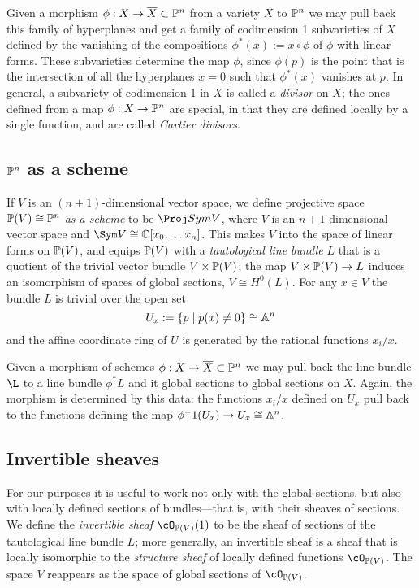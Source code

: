 Given a morphism $\phi: X\to \overline X \subset \PP^n$ from a variety $X$ to $\PP^n$ we may pull back this family of hyperplanes and get a family of codimension 1 subvarieties of $X$ defined by the vanishing of the compositions $\phi^*(x) := x\circ \phi$ of $\phi$ with linear forms. These subvarieties determine the map $\phi$, since $\phi(p)$ is the point that is the intersection of all the hyperplanes $x=0$ such that
$\phi^*(x)$ vanishes at $p$. In general, a subvariety of codimension 1 in $X$ is called a \emph{divisor} on $X$; the ones defined from a map $\phi: X\to \PP^n$ are special, in that they are defined locally by a single function, and are called \emph{Cartier divisors}.

\subsection{$\PP^n$ as a scheme}If $V$ is an $(n+1)$-dimensional vector space, we define projective space 
$\PP(V) \cong \PP^n$ \emph{as a scheme} to be $\Proj Sym V$, where $V$ is an $n+1$-dimensional vector space
and $\Sym V \cong \CC[x_0,\dots x_n]$. This makes $V$ into the space of linear forms on $\PP(V)$, and equips $\PP(V)$ with a \emph{tautological line bundle} $L$ that is a quotient of the trivial vector bundle
$V\times \PP(V)$; the map $V\times \PP(V) \to L$ induces an isomorphism of spaces of global sections,
$V \cong H^0(L)$. For any $x\in V$ the bundle $L$ is trivial over the open set 
$$
U_x :=  \{p \mid p(x) \neq 0\} \cong \AA^n
$$
and the affine coordinate ring of $U$ is generated by the rational functions $x_i/x$.

Given a morphism of schemes $\phi: X\to \overline X \subset \PP^n$ we may pull back the line bundle $\L$  to a line bundle $\phi^*L$ and it global sections to global sections on $X$. Again, the morphism is determined by this data: the functions $x_i/x$ defined on $U_x$ pull back to the functions defining the map
$\phi^-1(U_x) \to U_x \cong \AA^n$.

\subsection{Invertible sheaves}
For our purposes it is useful to work not only with the global sections, but also with locally defined sections of  bundles---that is, with their sheaves of sections. We define the \emph{invertible sheaf} $\cO_{\PP(V)}(1)$ to be the sheaf of sections of the tautological line bundle $L$; more generally, an invertible sheaf is a sheaf that is locally
isomorphic to the \emph{structure sheaf} of locally defined functions $\cO_{\PP(V)}$. The space $V$ reappears as the space of global sections of $\cO_{\PP(V)}$.

